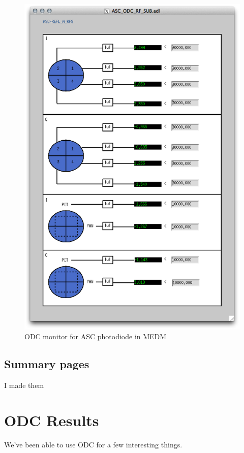 \begin{figure}[ht!]
\includegraphics[width=\textwidth]{figures/ODC/PD_screen}
\caption[ASC ODC Photodiode Monitor in MEDM]{ODC monitor for ASC photodiode in MEDM}
\end{figure}\label{fig:odc-pd-screen}

\subsection{Summary pages}
I made them

\section{ODC Results}

We've been able to use ODC for a few interesting things.

